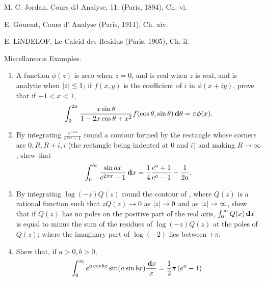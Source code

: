 M. C. Jordan, Cours dJ Analyse, 11. (Paris, 1894), Ch. vi.

E. Goursat, Cours d' Analyse (Paris, 1911), Ch. xiv.

E. LiNDELOF, Le Calcid des Residus (Paris, 1905), Ch. il.

%
%

Miscellaneous Examples.
\begin{enumerate}
\item  A function $\phi(z)$ is zero when $z=0$, and is real when $z$
  is real, and is analytic when $\left| z \right| \leq 1$; if $f(x,y)$ is
  the coefficient of $i$ in $\phi(x + iy)$, prove that if $-1 < x < 1$,
  $$
  \int_{0}^{2\pi}
  \frac{x \sin\theta }{ 1 - 2x\cos\theta + x^{2}}
  f(\cos\theta, \sin\theta)
  \, \mathbf{d}\theta
  =
  \pi \phi(x).
  $$
\item
  By integrating $\frac{e^{\pm aiz}}{e^{2\pi z}-1}$ round a contour formed by the rectangle whose
  corners are $0, R, R+i, i$ (the rectangle being indented at $0$ and
  $i$) and making $R\rightarrow\infty$,
  shew that
  $$
  \int_{0}^{\infty}
  \frac{ \sin ax }{e^{2 \pi x} - 1}
  \, \mathbf{d} x
  =
  \frac{1}{4}
  \frac{ e^{a} + 1 }{ e^{a} - 1 }
  -
  \frac{1}{2a}.
  $$

\item
  By integrating $\log (-z) Q(z)$ round the contour of
  , where $Q(z)$ is a rational function such
  that  $z Q(z) \rightarrow 0$ as $\left| z \right| \rightarrow 0$ and as
  $\left| z \right| \rightarrow \infty$, shew that if $Q(z)$ has no poles
  on the positive part of the real axis,
  $\int_{0}^{\infty} Q(x) \, \mathbf{d} x$ is equal to minus
  the sum of the residues of $\log(-z) Q(z)$ at the poles of
  $Q(z)$; where the imaginary part of $\log(-2)$ lies between $\pm\pi$.

\item
  Shew that, if $a > 0, b > 0$,
  $$
  \int_{0}^{\infty}
  e^{a \cos bx} \sin (a \sin bx) \frac{\, \mathbf{d} x}{x}
  =
  \frac{1}{2} \pi \left(  e^{a} - 1  \right).
  $$


\end{enumerate}
